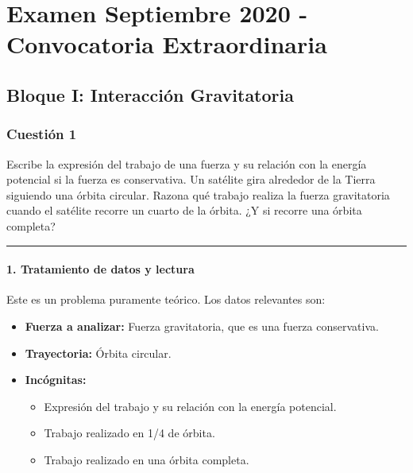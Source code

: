 \chapter{Examen Septiembre 2020 - Convocatoria Extraordinaria}
\label{chap:2020_sep_ext}

\section{Bloque I: Interacción Gravitatoria}
\label{sec:grav_2020_sep_ext}

\subsection{Cuestión 1}
\label{subsec:C1_2020_sep_ext}

\begin{cajaenunciado}
Escribe la expresión del trabajo de una fuerza y su relación con la energía potencial si la fuerza es conservativa. Un satélite gira alrededor de la Tierra siguiendo una órbita circular. Razona qué trabajo realiza la fuerza gravitatoria cuando el satélite recorre un cuarto de la órbita. ¿Y si recorre una órbita completa?
\end{cajaenunciado}
\hrule

\subsubsection*{1. Tratamiento de datos y lectura}
Este es un problema puramente teórico. Los datos relevantes son:
\begin{itemize}
    \item \textbf{Fuerza a analizar:} Fuerza gravitatoria, que es una fuerza conservativa.
    \item \textbf{Trayectoria:} Órbita circular.
    \item \textbf{Incógnitas:}
    \begin{itemize}
        \item Expresión del trabajo y su relación con la energía potencial.
        \item Trabajo realizado en 1/4 de órbita.
        \item Trabajo realizado en una órbita completa.
    \end{itemize}
\end{itemize}

